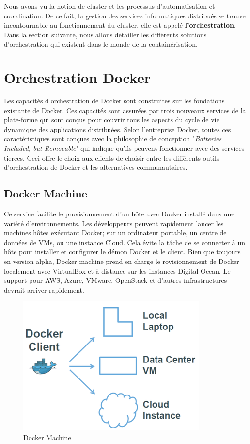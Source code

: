 \begin{onehalfspace}
Nous avons vu la notion de cluster et les processus d'automatisation et coordination. De ce fait, la gestion des services informatiques distribués se trouve incontournable au fonctionnement du cluster, elle est appelé \textbf{l'orchestration}. Dans la section suivante, nous allons détailler les différents solutions d'orchestration qui existent dans le monde de la containérisation.

\section{Orchestration Docker}
Les capacités d'orchestration de Docker sont construites sur les fondations existante de Docker. Ces capacités sont assurées par trois nouveaux services de la plate-forme qui sont conçus pour couvrir tous les aspects du cycle de vie dynamique des applications distribuées. Selon l'entreprise Docker, toutes ces caractéristiques sont conçues avec la philosophie de conception "\emph{Batteries Included, but Removable}" qui indique qu'ils peuvent fonctionner avec des services tierces. Ceci offre le choix aux clients de choisir entre les différents outils d'orchestration de Docker et les alternatives communautaires.


\subsection*{Docker Machine}
 Ce service facilite le provisionnement d'un hôte avec Docker installé dans une variété d'environnements. Les développeurs peuvent rapidement lancer les machines hôtes exécutant Docker; sur un ordinateur portable, un centre de données de VMs, ou une instance Cloud. Cela évite la tâche de se connecter à un hôte pour installer et configurer le démon Docker et le client. Bien que toujours en version alpha, Docker machine prend en charge le rovisionnement de Docker localement avec VirtualBox et à distance sur les instances Digital Ocean. Le support pour AWS, Azure, VMware, OpenStack et d'autres infrastructures devrait arriver rapidement.
 \begin{figure}[H]
\centering
\includegraphics [scale=0.6]{chapitre3/assets/dockermachine.png}
\caption{Docker Machine}
\end{figure}

\end{onehalfspace}
